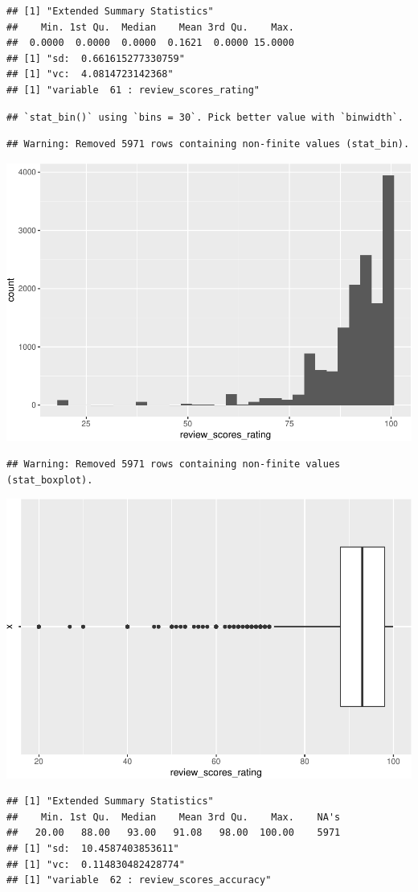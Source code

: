 \begin{verbatim}
## [1] "Extended Summary Statistics"
##    Min. 1st Qu.  Median    Mean 3rd Qu.    Max. 
##  0.0000  0.0000  0.0000  0.1621  0.0000 15.0000 
## [1] "sd:  0.661615277330759"
## [1] "vc:  4.0814723142368"
## [1] "variable  61 : review_scores_rating"
\end{verbatim}

\begin{verbatim}
## `stat_bin()` using `bins = 30`. Pick better value with `binwidth`.
\end{verbatim}

\begin{verbatim}
## Warning: Removed 5971 rows containing non-finite values (stat_bin).
\end{verbatim}

\includegraphics[width=0.5\linewidth]{anal_files/figure-latex/figures-side-42}

\begin{verbatim}
## Warning: Removed 5971 rows containing non-finite values (stat_boxplot).
\end{verbatim}

\includegraphics[width=0.5\linewidth]{anal_files/figure-latex/figures-side-43}

\begin{verbatim}
## [1] "Extended Summary Statistics"
##    Min. 1st Qu.  Median    Mean 3rd Qu.    Max.    NA's 
##   20.00   88.00   93.00   91.08   98.00  100.00    5971 
## [1] "sd:  10.4587403853611"
## [1] "vc:  0.114830482428774"
## [1] "variable  62 : review_scores_accuracy"
\end{verbatim}


